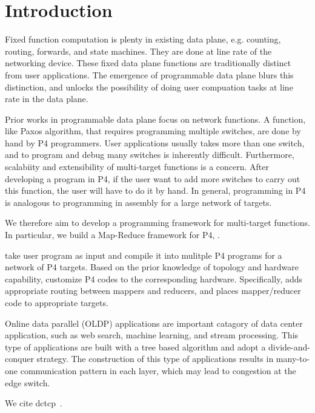 \section{Introduction}

Fixed function computation is plenty in existing data plane, e.g. counting, routing, forwards, and state machines. 
They are done at line rate of the networking device. 
These fixed data plane functions are traditionally distinct from user applications. 
The emergence of programmable data plane blurs this distinction, and unlocks the possibility of doing user compuation tasks at line rate in the data plane.

Prior works in programmable data plane focus on network functions. A function, like Paxos algorithm, that requires programming multiple switches, are done by hand by P4 programmers. User applications usually takes more than one switch, and to program and debug many switches is inherently difficult. Furthermore, scalabiity and extensibility of multi-target functions is a concern. After developing a program in P4, if the user want to add more switches to carry out this function, the user will have to do it by hand. In general, programming in P4 is analogous to programming in assembly for a large network of targets.

We therefore aim to develop a programming framework for multi-target functions. In particular, we build a Map-Reduce framework for P4, \sys. 

\sys take user program as input and compile it into mulitple P4 programs for a network of P4 targets. 
Based on the prior knowledge of topology and hardware capability, \sys customize P4 codes to the corresponding hardware.
Specifically, \sys adds appropriate routing between mappers and reducers, and  places mapper/reducer code to appropriate targets.

Online data parallel (OLDP) applications are important catagory of data center application, such as web search, machine learning, and stream processing. 
This type of applications are built with a tree based algorithm and adopt a divide-and-conquer strategy. 
The construction of this type of applications results in many-to-one communication pattern in each layer, which may lead to congestion at the edge switch.


We cite dctcp~\cite{dctcp}.
